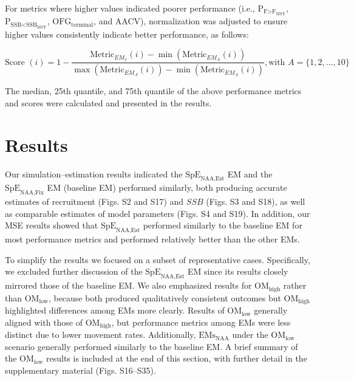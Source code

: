 \documentclass[
  12pt,
]{article}
\begin{document}
For metrics where higher values indicated poorer performance (i.e.,
\(\text{P}_{\text{F>F}_{\text{MSY}}}\),
\(\text{P}_{\text{SSB<SSB}_{\text{MSY}}}\),
\(\text{OFG}_\text{terminal}\), and AACV), normalization was adjusted to
ensure higher values consistently indicate better performance, as
follows:

\begin{equation}
\text{Score } (i) = 1- \frac{\text{Metric}_{EM_x}(i) - \min(\text{Metric}_{EM_{A}}(i))}{\max(\text{Metric}_{EM_{A}}(i)) - \min(\text{Metric}_{EM_{A}}(i))}, \text{with } A = \{1, 2, \dots, 10\}
\end{equation}

The median, 25th quantile, and 75th quantile of the above performance
metrics and scores were calculated and presented in the results.

\hypertarget{results}{%
\section{Results}\label{results}}

Our simulation--estimation results indicated the
\(\text{SpE}_{\scriptscriptstyle \text{NAA,Est}}\) EM and the
\(\text{SpE}_{\scriptscriptstyle \text{NAA,Fix}}\) EM (baseline EM)
performed similarly, both producing accurate estimates of recruitment
(Figs. S2 and S17) and \(SSB\) (Figs. S3 and S18), as well as comparable
estimates of model parameters (Figs. S4 and S19). In addition, our MSE
results showed that \(\text{SpE}_{\scriptscriptstyle \text{NAA,Est}}\)
performed similarly to the baseline EM for most performance metrics and
performed relatively better than the other EMs.

To simplify the results we focused on a subset of representative cases.
Specifically, we excluded further discussion of the
\(\text{SpE}_{\scriptscriptstyle \text{NAA,Est}}\) EM since its results
closely mirrored those of the baseline EM. We also emphasized results
for \(\text{OM}_{\text{high}}\) rather than \(\text{OM}_{\text{low}}\),
because both produced qualitatively consistent outcomes but
\(\text{OM}_{\text{high}}\) highlighted differences among EMs more
clearly. Results of \(\text{OM}_{\text{low}}\) generally aligned with
those of \(\text{OM}_{\text{high}}\), but performance metrics among EMs
were less distinct due to lower movement rates. Additionally,
\(\text{EMs}_{\scriptscriptstyle \text{NAA}}\) under the
\(\text{OM}_{\text{low}}\) scenario generally performed similarly to the
baseline EM. A brief summary of the \(\text{OM}_{\text{low}}\) results
is included at the end of this section, with further detail in the
supplementary material (Figs. S16--S35).
\end{document}
